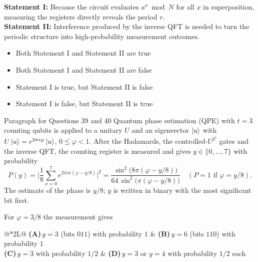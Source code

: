 \documentclass[11pt,a4paper]{article}
\newcommand{\optlabel}[1]{\textbf{(#1)}}
\newenvironment{qitem}[1]{\begin{list}{}{\setlength{\leftmargin}{3.3em}\setlength{\labelwidth}{3.1em}%
  \setlength{\labelsep}{0.2em}\setlength{\topsep}{3pt}\setlength{\parsep}{3pt}}\item[\textbf{Q.#1}\hfill]}{\end{list}}
\newcommand{\qsep}{\par\vspace{2pt}{\color{black!15}\hrule}\vspace{4pt}}
\begin{document}
\begin{qitem}{38}
\textbf{Statement I:} Because the circuit evaluates $a^x \bmod N$ for all $x$ in superposition, measuring the registers directly reveals the period $r$.\\[1mm]
\textbf{Statement II:} Interference produced by the inverse QFT is needed to turn the periodic structure into high-probability measurement outcomes.
\begin{itemize}[leftmargin=2.6em, labelsep=0.4em, itemsep=2pt, topsep=3pt]
\item[\optlabel{A}] Both Statement I and Statement II are true
\item[\optlabel{B}] Both Statement I and Statement II are false
\item[\optlabel{C}] Statement I is true, but Statement II is false
\item[\optlabel{D}] Statement I is false, but Statement II is true
\end{itemize}
\end{qitem}
\qsep

\begin{passagebox}{Paragraph for Questions 39 and 40}
Quantum phase estimation (QPE) with $t = 3$ counting qubits is applied to a unitary $U$ and an eigenvector $\ket u$ with
$U\ket u = e^{2\pi i\varphi}\ket u$, $0 \le \varphi < 1$. After the Hadamards, the controlled-$U^{2^j}$ gates and the inverse QFT, the counting register is
measured and gives $y \in \{0, \dots, 7\}$ with probability
\[ P(y) = \Big|\frac18\sum_{x=0}^{7}e^{2\pi ix(\varphi - y/8)}\Big|^2 = \frac{\sin^2\big(8\pi(\varphi - y/8)\big)}{64\,\sin^2\big(\pi(\varphi - y/8)\big)}\quad(P = 1\text{ if }\varphi = y/8). \]
The estimate of the phase is $y/8$; $y$ is written in binary with the most significant bit first.
\end{passagebox}
\begin{qitem}{39}
For $\varphi = 3/8$ the measurement gives
\par\smallskip\noindent\begin{tabularx}{\linewidth}{@{}*{2}{L}@{}}
\optlabel{A}\,$y = 3$ (bits $011$) with probability $1$ & \optlabel{B}\,$y = 6$ (bits $110$) with probability $1$ \\[3pt]
\optlabel{C}\,$y = 3$ with probability $1/2$ & \optlabel{D}\,$y = 3$ or $y = 4$ with probability $1/2$ each
\end{tabularx}
\end{qitem}
\qsep
\end{document}
